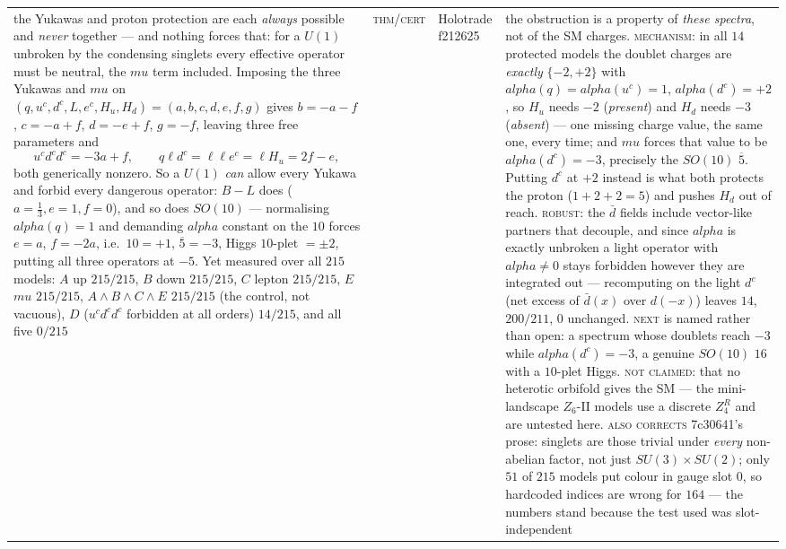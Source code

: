 \documentclass[12pt,a4paper]{article}
\def\mathbf#1{#1}%
\def\textbf#1{#1}%
\def\texttt#1{#1}%
\def\alpha{alpha}%
\def\mu{mu}%
\theoremstyle{definition}
\begin{document}
\begin{center}
\begin{tabular}{@{}p{}llp{}@{}}
\textbf{the Yukawas and proton protection are each \emph{always} possible and \emph{never} together --- and nothing forces that}: for a $U(1)$ unbroken by the condensing singlets every effective operator must be neutral, the $\mu$ term included. Imposing the three Yukawas and $\mu$ on $(q,u^c,d^c,L,e^c,H_u,H_d)=(a,b,c,d,e,f,g)$ gives $b=-a-f$, $c=-a+f$, $d=-e+f$, $g=-f$, leaving three free parameters and \[u^cd^cd^c=-3a+f,\qquad q\ell d^c=\ell\ell e^c=\ell H_u=2f-e,\] both generically nonzero. So a $U(1)$ \emph{can} allow every Yukawa and forbid every dangerous operator: $B-L$ does ($a=\tfrac13,e=1,f=0$), and so does $SO(10)$ --- normalising $\alpha(q)=1$ and demanding $\alpha$ constant on the $\mathbf{10}$ forces $e=a$, $f=-2a$, i.e.\ $\mathbf{10}=+1$, $\overline{\mathbf{5}}=-3$, Higgs $10$-plet $=\pm2$, putting all three operators at $-5$. Yet measured over all $215$ models: $A$ up $215/215$, $B$ down $215/215$, $C$ lepton $215/215$, $E$ $\mu$ $215/215$, \emph{$A\wedge B\wedge C\wedge E$ $215/215$} (the control, not vacuous), $D$ ($u^cd^cd^c$ forbidden at all orders) $14/215$, and \textbf{all five $0/215$} & \textsc{thm}/\textsc{cert} & Holotrade \texttt{f212625} & the obstruction is a property of \emph{these spectra}, not of the SM charges. \textsc{mechanism}: in all $14$ protected models the doublet charges are \emph{exactly} $\{-2,+2\}$ with $\alpha(q)=\alpha(u^c)=1$, $\alpha(d^c)=+2$, so $H_u$ needs $-2$ (\emph{present}) and $H_d$ needs $-3$ (\emph{absent}) --- one missing charge value, the same one, every time; and $\mu$ forces that value to be $\alpha(d^c)=-3$, precisely the $SO(10)$ $\overline{\mathbf 5}$. Putting $d^c$ at $+2$ instead is what both protects the proton ($1{+}2{+}2=5$) and pushes $H_d$ out of reach. \textsc{robust}: the $\bar d$ fields include vector-like partners that decouple, and since $\alpha$ is exactly unbroken a light operator with $\alpha\neq0$ stays forbidden however they are integrated out --- recomputing on the light $d^c$ (net excess of $\bar d(x)$ over $d(-x)$) leaves $14$, $200/211$, $0$ unchanged. \textsc{next} is named rather than open: a spectrum whose doublets reach $-3$ while $\alpha(d^c)=-3$, a genuine $SO(10)$ $\mathbf{16}$ with a $10$-plet Higgs. \textsc{not claimed}: that no heterotic orbifold gives the SM --- the mini-landscape $Z_6$-II models use a discrete $Z_4^R$ and are untested here. \textsc{also corrects} \texttt{7c30641}'s prose: singlets are those trivial under \emph{every} non-abelian factor, not just $SU(3)\times SU(2)$; only $51$ of $215$ models put colour in gauge slot $0$, so hardcoded indices are wrong for $164$ --- the numbers stand because the test used was slot-independent \\

\end{tabular}
\end{center}
\end{document}
